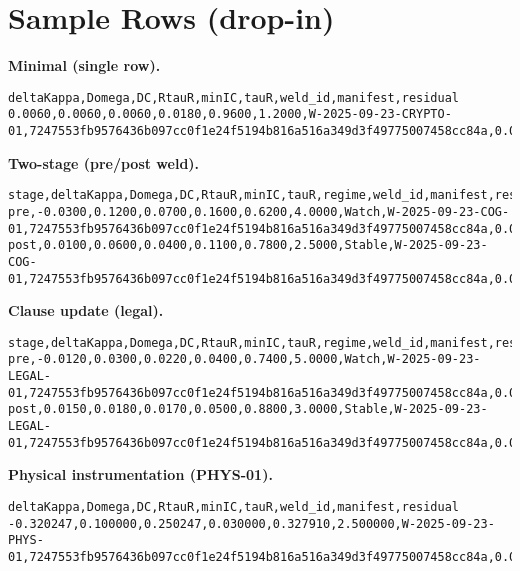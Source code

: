 \section{Sample Rows (drop-in)}
\label{sec:csv-samples}

\noindent\textbf{Minimal (single row).}
\begin{lstlisting}[style=umcpstyle, numbers=none, frame=single, basicstyle=\ttfamily\small, columns=fullflexible]
deltaKappa,Domega,DC,RtauR,minIC,tauR,weld_id,manifest,residual
0.0060,0.0060,0.0060,0.0180,0.9600,1.2000,W-2025-09-23-CRYPTO-01,7247553fb9576436b097cc0f1e24f5194b816a516a349d3f49775007458cc84a,0.0000
\end{lstlisting}

\medskip
\noindent\textbf{Two-stage (pre/post weld).}
\begin{lstlisting}[style=umcpstyle, numbers=none, frame=single, basicstyle=\ttfamily\small, columns=fullflexible]
stage,deltaKappa,Domega,DC,RtauR,minIC,tauR,regime,weld_id,manifest,residual
pre,-0.0300,0.1200,0.0700,0.1600,0.6200,4.0000,Watch,W-2025-09-23-COG-01,7247553fb9576436b097cc0f1e24f5194b816a516a349d3f49775007458cc84a,0.0000
post,0.0100,0.0600,0.0400,0.1100,0.7800,2.5000,Stable,W-2025-09-23-COG-01,7247553fb9576436b097cc0f1e24f5194b816a516a349d3f49775007458cc84a,0.0000
\end{lstlisting}

\newpage
\noindent\textbf{Clause update (legal).}
\begin{lstlisting}[style=umcpstyle, numbers=none, frame=single, basicstyle=\ttfamily\small, columns=fullflexible]
stage,deltaKappa,Domega,DC,RtauR,minIC,tauR,regime,weld_id,manifest,residual
pre,-0.0120,0.0300,0.0220,0.0400,0.7400,5.0000,Watch,W-2025-09-23-LEGAL-01,7247553fb9576436b097cc0f1e24f5194b816a516a349d3f49775007458cc84a,0.0000
post,0.0150,0.0180,0.0170,0.0500,0.8800,3.0000,Stable,W-2025-09-23-LEGAL-01,7247553fb9576436b097cc0f1e24f5194b816a516a349d3f49775007458cc84a,0.0000
\end{lstlisting}

\medskip
\noindent\textbf{Physical instrumentation (PHYS-01).}
\begin{lstlisting}[style=umcpstyle, numbers=none, frame=single, basicstyle=\ttfamily\small, columns=fullflexible]
deltaKappa,Domega,DC,RtauR,minIC,tauR,weld_id,manifest,residual
-0.320247,0.100000,0.250247,0.030000,0.327910,2.500000,W-2025-09-23-PHYS-01,7247553fb9576436b097cc0f1e24f5194b816a516a349d3f49775007458cc84a,0.0000
\end{lstlisting}

